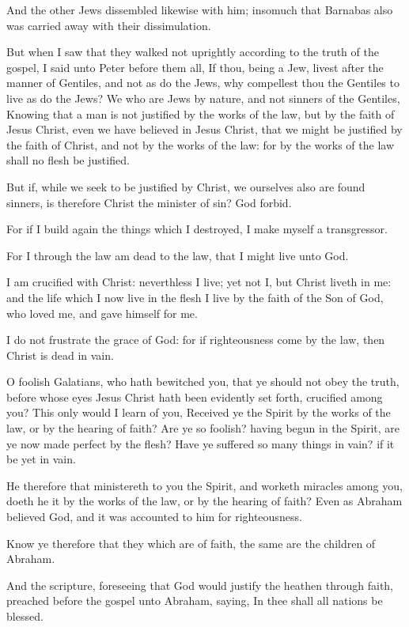 \Verse And the other Jews dissembled likewise with him; insomuch that Barnabas also was carried away with their dissimulation.

\Verse But when I saw that they walked not uprightly according to the truth of the gospel, I said unto Peter before them all, If thou, being a Jew, livest after the manner of Gentiles, and not as do the Jews, why compellest thou the Gentiles to live as do the Jews?  \Verse We who are Jews by nature, and not sinners of the Gentiles, \Verse Knowing that a man is not justified by the works of the law, but by the faith of Jesus Christ, even we have believed in Jesus Christ, that we might be justified by the faith of Christ, and not by the works of the law: for by the works of the law shall no flesh be justified.

\Verse But if, while we seek to be justified by Christ, we ourselves also are found sinners, is therefore Christ the minister of sin? God forbid.

\Verse For if I build again the things which I destroyed, I make myself a transgressor.

\Verse For I through the law am dead to the law, that I might live unto God.

\Verse I am crucified with Christ: neverthless I live; yet not I, but Christ liveth in me: and the life which I now live in the flesh I live by the faith of the Son of God, who loved me, and gave himself for me.

\Verse I do not frustrate the grace of God: for if righteousness come by the law, then Christ is dead in vain.


\Chapter
\Verse O foolish Galatians, who hath bewitched you, that ye should not obey the truth, before whose eyes Jesus Christ hath been evidently set forth, crucified among you?  \Verse This only would I learn of you, Received ye the Spirit by the works of the law, or by the hearing of faith?  \Verse Are ye so foolish? having begun in the Spirit, are ye now made perfect by the flesh?  \Verse Have ye suffered so many things in vain? if it be yet in vain.

\Verse He therefore that ministereth to you the Spirit, and worketh miracles among you, doeth he it by the works of the law, or by the hearing of faith?  \Verse Even as Abraham believed God, and it was accounted to him for righteousness.

\Verse Know ye therefore that they which are of faith, the same are the children of Abraham.

\Verse And the scripture, foreseeing that God would justify the heathen through faith, preached before the gospel unto Abraham, saying, In thee shall all nations be blessed.

